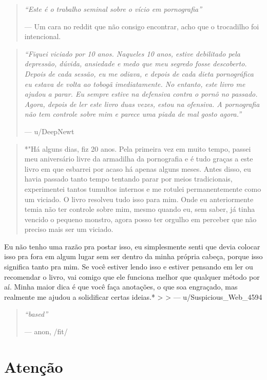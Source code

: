 \documentclass[
  spanish,
  openany]{book}
\begin{document}
\begin{quote}
\emph{``Este é o trabalho seminal sobre o vício em pornografia''}

--- Um cara no reddit que não consigo encontrar, acho que o trocadilho foi intencional.
\end{quote}

\begin{quote}
\emph{``Fiquei viciado por 10 anos. Naqueles 10 anos, estive debilitado pela depressão, dúvida, ansiedade e medo que meu segredo fosse descoberto. Depois de cada sessão, eu me odiava, e depois de cada dieta pornográfica eu estava de volta ao tobogã imediatamente. No entanto, este livro me ajudou a parar. Eu sempre estive na defensiva contra o pornô no passado. Agora, depois de ler este livro duas vezes, estou na ofensiva. A pornografia não tem controle sobre mim e parece uma piada de mal gosto agora.''}

--- u/DeepNewt
\end{quote}

\begin{quote}
*"Há alguns dias, fiz 20 anos. Pela primeira vez em muito tempo, passei meu aniversário livre da armadilha da pornografia e é tudo graças a este livro em que esbarrei por acaso há apenas alguns meses. Antes disso, eu havia passado tanto tempo tentando parar por meios tradicionais, experimentei tantos tumultos internos e me rotulei permanentemente como um viciado. O livro resolveu tudo isso para mim. Onde eu anteriormente temia não ter controle sobre mim, mesmo quando eu, sem saber, já tinha vencido o pequeno monstro, agora posso ter orgulho em perceber que não preciso mais ser um viciado.
\end{quote}

Eu não tenho uma razão pra postar isso, eu simplesmente senti que devia colocar isso pra fora em algum lugar sem ser dentro da minha própria cabeça, porque isso significa tanto pra mim. Se você estiver lendo isso e estiver pensando em ler ou recomendar o livro, vai comigo que ele funciona melhor que qualquer método por aí. Minha maior dica é que você faça anotações, o que soa engraçado, mas realmente me ajudou a solidificar certas ideias.*
\textgreater{}
\textgreater{} --- u/Suspicious\_Web\_4594

\begin{quote}
\emph{``based''}

--- anon, /fit/
\end{quote}

\hypertarget{atenuxe7uxe3o}{%
\section{Atenção}\label{atenuxe7uxe3o}}
\end{document}
